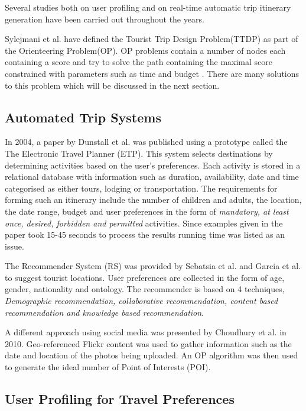 Several studies both on user profiling and on real-time automatic trip
itinerary generation have been carried out throughout the years. 

Sylejmani et al.\cite{Sylejmani2017} have defined the Tourist Trip
Design Problem(TTDP) as part of the Orienteering Problem(OP). OP
problems contain a number of nodes each containing a score and try to
solve the path containing the maximal score constrained with
parameters such as time and budget \cite{Gunawan2016}. There are many
solutions to this problem which will be discussed in the next section.

\subsection{Automated Trip Systems}


In 2004, a paper by Dunstall et al. \cite{DUNSTALL2008a} was published
using a prototype called the The Electronic Travel Planner (ETP). This
system selects destinations by determining activities based on the
user’s preferences. Each activity is stored in a relational database
with information such as duration, availability, date and time
categorised as either tours, lodging or transportation. The
requirements for forming such an itinerary include the number of
children and adults, the location, the date range, budget and user
preferences in the form of \emph{mandatory, at least once, desired,
forbidden and permitted} activities. Since examples given in the paper took 15-45 seconds to process
the results running time was listed as an issue.

The Recommender System (RS) was provided by Sebatsia et al.
\cite{Sebastia2009a} and Garcia et al. \cite{Garcia2011} to suggest tourist locations.
User preferences are collected in the form of age, gender, nationality
and ontology. The recommender is based on 4 techniques, \emph{Demographic
recommendation, collaborative recommendation, content based
recommendation and knowledge based recommendation}. 

A different approach using social media was presented by Choudhury et
al. \cite{DeChoudhury2010} in 2010. Geo-referenced Flickr content was used to gather
information such as the date and location of the photos being
uploaded. An OP algorithm was then used to generate the ideal number
of Point of Interests (POI).




\subsection{User Profiling for Travel Preferences}
 
